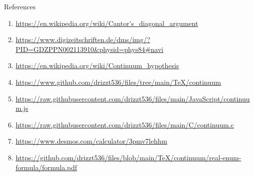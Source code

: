 \documentclass[12pt]{article}
\begin{document}
\pagebreak\begin{section}{References}\label{sec:references}
	\begin{enumerate}
		\item\url{https://en.wikipedia.org/wiki/Cantor's\_diagonal\_argument}\\
		\label{ref:diagonal argument}

		\item\url{https://www.digizeitschriften.de/dms/img/?PID=GDZPPN002113910&physid=phys84#navi}\\
		\label{ref:cantor-1891}

		\item\url{https://en.wikipedia.org/wiki/Continuum\_hypothesis}\\
		\label{ref:continuum}

		\item\url{https://www.github.com/drizzt536/files/tree/main/TeX/continuum}\\
		\label{ref:files}

		\item\url{https://raw.githubusercontent.com/drizzt536/files/main/JavaScript/continuum.js}\\
		\label{ref:js-code}

		\item\url{https://raw.githubusercontent.com/drizzt536/files/main/C/continuum.c}\\
		\label{ref:c-code}

		\item\url{https://www.desmos.com/calculator/3pmv7lehhm}\\
		\label{ref:desmos real-enum}

		\item\url{https://github.com/drizzt536/files/blob/main/TeX/continuum/real-enum-formula/formula.pdf}\\
		\label{ref:pdf real-enum}


\end{enumerate}
\end{section}
\end{document}
